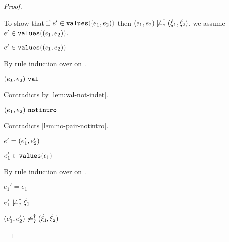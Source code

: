 \begin{proof}
\begin{byCases}
\begin{byCases}
\begin{byCases}
        To show that if $\inValues{e'}{\hpair{e_1}{e_2}}$ then $(e_1 , e_2) \not\models_{?}^{\dag} (\dot{\xi}_1 , \dot{\xi}_2)$, we assume $\inValues{e'}{\hpair{e_1}{e_2}}$.
        \begin{pfsteps*}
        \item $\inValues{e'}{\hpair{e_1}{e_2}}$  
        \end{pfsteps*}
        By rule induction over  on .
        \begin{byCases}
          \item[\text{(\ref{rule:IVVal})}]
          \begin{pfsteps*}
          \item $(e_1 , e_2) ~\mathtt{val}$ 
          \end{pfsteps*} 
          Contradicts  by \autoref{lem:val-not-indet}.
          \item[\text{(\ref{rule:IVIndet})}] 
          \begin{pfsteps*}
          \item $(e_1 , e_2) ~\mathtt{notintro}$ 
          \end{pfsteps*}
          Contradicts \autoref{lem:no-pair-notintro}.
          \item[\text{(\ref{rule:IVPair})}]
          \begin{pfsteps*}
          \item $e'=(e_1' , e_2')$ 
          \item $\inValues{e_1'}{e_1}$  
          \end{pfsteps*}
          By rule induction over  on .
          \begin{byCases}
            \item[\text{(\ref{rule:IVVal})}]
            \begin{pfsteps*}
            \item $e_1'=e_1$  
            \item $e_1' \not\models_{?}^{\dag} \dot{\xi}_1$  
            \item $(e_1' , e_2') \not\models_{?}^{\dag} (\dot{\xi}_1 , \dot{\xi}_2)$ 

\end{pfsteps*}
\end{byCases}
\end{byCases}
\end{byCases}
\end{byCases}
\end{byCases}
\end{proof}
